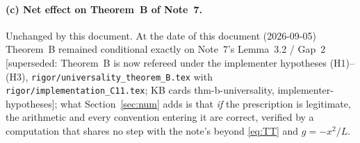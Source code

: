 \documentclass[11pt]{article}
\begin{document}
\paragraph{(c) Net effect on Theorem~B of Note~7.}  Unchanged by this document.  At the date of this document (2026-09-05) Theorem~B remained
conditional exactly on Note~7's Lemma~3.2 / Gap~2 [superseded: Theorem~B is now refereed under the implementer hypotheses (H1)--(H3), \texttt{rigor/universality\_theorem\_B.tex} with \texttt{rigor/implementation\_C11.tex}; KB cards thm-b-universality, implementer-hypotheses]; what Section~\ref{sec:num} adds is that
\emph{if} the prescription is legitimate, the arithmetic and every convention entering it are correct,
verified by a computation that shares no step with the note's beyond \eqref{eq:TT} and $g=-x^2/L$.
\end{document}
